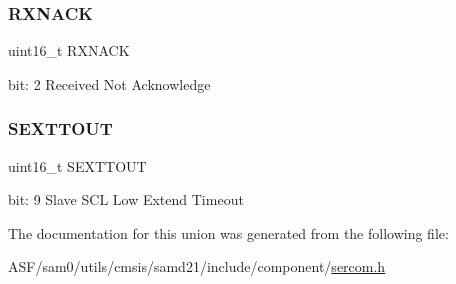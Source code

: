 \subsubsection{\texorpdfstring{RXNACK}{RXNACK}}
{\footnotesize\ttfamily uint16\+\_\+t R\+X\+N\+A\+CK}

bit\+: 2 Received Not Acknowledge \mbox{\label{union_s_e_r_c_o_m___i2_c_m___s_t_a_t_u_s___type_a369d5cf43d681c76345e0e85228bf532}} 
\subsubsection{\texorpdfstring{SEXTTOUT}{SEXTTOUT}}
{\footnotesize\ttfamily uint16\+\_\+t S\+E\+X\+T\+T\+O\+UT}

bit\+: 9 Slave S\+CL Low Extend Timeout 

The documentation for this union was generated from the following file\+:\begin{DoxyCompactItemize}
\item 
A\+S\+F/sam0/utils/cmsis/samd21/include/component/\mbox{\hyperlink{utils_2cmsis_2samd21_2include_2component_2sercom_8h}{sercom.\+h}}\end{DoxyCompactItemize}

